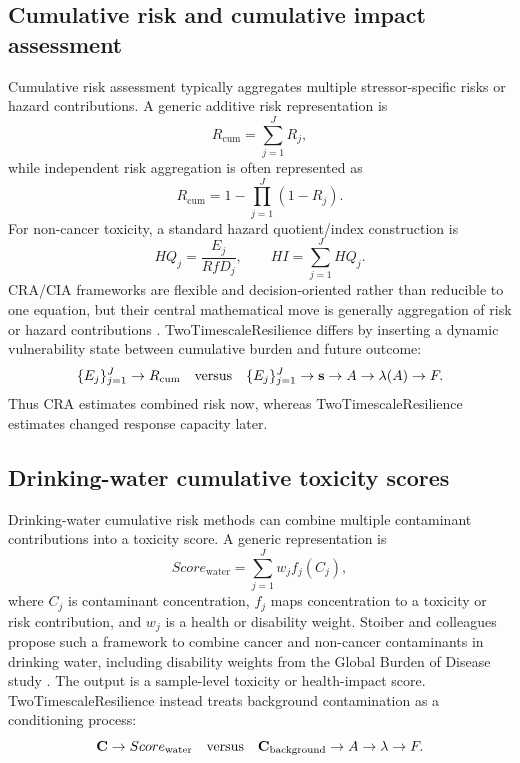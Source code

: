 	\subsection{Cumulative risk and cumulative impact assessment}
	
	Cumulative risk assessment typically aggregates multiple stressor-specific risks or hazard contributions. A generic additive risk representation is
	\begin{equation}
		R_{\mathrm{cum}}=\sum_{j=1}^J R_j,
	\end{equation}
	while independent risk aggregation is often represented as
	\begin{equation}
		R_{\mathrm{cum}}=1-\prod_{j=1}^J(1-R_j).
	\end{equation}
	For non-cancer toxicity, a standard hazard quotient/index construction is
	\begin{equation}
		HQ_j=\frac{E_j}{RfD_j},
		\qquad
		HI=\sum_{j=1}^J HQ_j.
	\end{equation}
	CRA/CIA frameworks are flexible and decision-oriented rather than reducible to one equation, but their central mathematical move is generally aggregation of risk or hazard contributions \citep{epa2003cumulative,sexton2012cumulative,epa2025cumulative}. TwoTimescaleResilience differs by inserting a dynamic vulnerability state between cumulative burden and future outcome:
	\begin{equation}
		\{E_j\}_{j=1}^J\rightarrow R_{\mathrm{cum}}
		\quad\hbox{versus}\quad
		\{E_j\}_{j=1}^J\rightarrow \mathbf{s}\rightarrow A\rightarrow\lambda(A)\rightarrow F.
	\end{equation}
	Thus CRA estimates combined risk now, whereas TwoTimescaleResilience estimates changed response capacity later.
	
	\subsection{Drinking-water cumulative toxicity scores}
	
	Drinking-water cumulative risk methods can combine multiple contaminant contributions into a toxicity score. A generic representation is
	\begin{equation}
		Score_{\mathrm{water}}=\sum_{j=1}^J w_j f_j(C_j),
	\end{equation}
	where $C_j$ is contaminant concentration, $f_j$ maps concentration to a toxicity or risk contribution, and $w_j$ is a health or disability weight. Stoiber and colleagues propose such a framework to combine cancer and non-cancer contaminants in drinking water, including disability weights from the Global Burden of Disease study \citep{stoiber2019drinking}. The output is a sample-level toxicity or health-impact score. TwoTimescaleResilience instead treats background contamination as a conditioning process:
	\begin{equation}
		\mathbf{C}\rightarrow Score_{\mathrm{water}}
		\quad\hbox{versus}\quad
		\mathbf{C}_{\mathrm{background}}\rightarrow A\rightarrow\lambda\rightarrow F.
	\end{equation}
	
